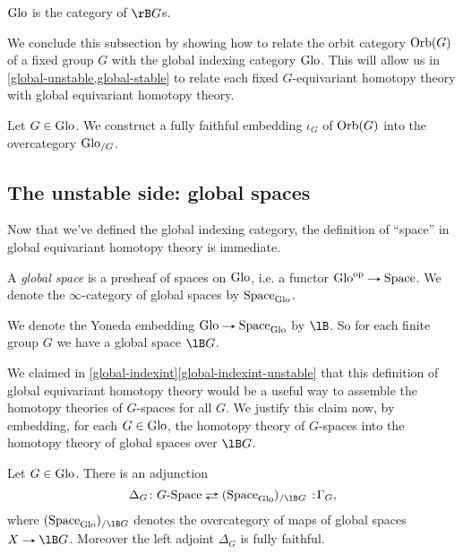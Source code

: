 \begin{lemma}
  \label{global-bgcat}
  $\mathrm{Glo}$ is the category of $\rB G$s.
\end{lemma}

We conclude this subsection by showing how to relate the orbit
category $\mathrm{Orb}(G)$ of a fixed group $G$ with the global indexing
category $\mathrm{Glo}$. This will allow us in
\cref{global-unstable,global-stable} to relate each fixed
$G$-equivariant homotopy theory with global equivariant homotopy
theory.

\begin{construction}
  \label{global-orbtoglo}
  Let $G \in \mathrm{Glo}$. We construct a fully faithful embedding $\iota_G$
  of $\mathrm{Orb}(G)$ into the overcategory $\mathrm{Glo}_{/G}$.
\end{construction}


\subsection{The unstable side: global spaces}
\label{global-unstable}

Now that we've defined the global indexing category, the definition of
``space'' in global equivariant homotopy theory is immediate.

\begin{definition}
  \label{global-space}
  A \emph{global space} is a presheaf of spaces on $\mathrm{Glo}$, i.e. a
  functor $\Glo^\op \to \Space$. We denote the $\infty$-category of
  global spaces by $\mathrm{Space}_{\mathrm{Glo}}$.
\end{definition}

\begin{notation}
  \label{global-yoneda}
  We denote the Yoneda embedding $\Glo \to \Space_\Glo$ by $\lB$. So
  for each finite group $G$ we have a global space $\lB G$.
\end{notation}

We claimed in \cref{global-indexint}\cref{global-indexint-unstable}
that this definition of global equivariant homotopy theory would be a
useful way to assemble the homotopy theories of $G$-spaces for all
$G$. We justify this claim now, by embedding, for each $G \in \mathrm{Glo}$,
the homotopy theory of $G$-spaces into the homotopy theory of global
spaces over $\lB G$.

\begin{proposition}
  \label{global-gspace-adj}
  Let $G \in \mathrm{Glo}$. There is an adjunction
  \[
  \Delta_G \c G\dash\Space \fromto
  (\Space_{\Glo})_{/\lB G} \lc \Gamma_G,
  \]
  where $(\Space_\Glo)_{/\lB G}$ denotes the overcategory of maps of
  global spaces $X \to \lB G$. Moreover the left adjoint $\Delta_G$ is
  fully faithful.
\end{proposition}

